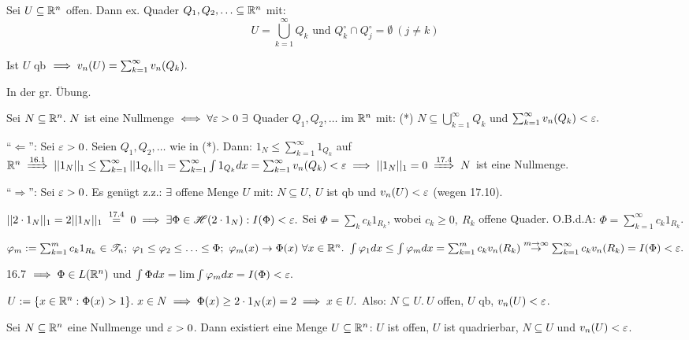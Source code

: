 \documentclass[a4paper,twoside,DIV15,BCOR12mm]{scrbook}
\begin{document}
\begin{satz}
Sei $U\subseteq\mathbb{R}^n$ offen. Dann ex. Quader $Q_1,Q_2,\ldots \subseteq\mathbb{R}^n$ mit: $$U=\bigcup_{k=1}^\infty Q_k\text{ und }Q_k^\circ\cap Q_j^\circ = \emptyset\ (j\ne k)$$

Ist $U$ qb $\implies v_n(U)=\sum_{k=1}^\infty v_n(Q_k).$
\end{satz}

\begin{beweis}
In der gr. Übung.
\end{beweis}

\begin{satz}
Sei $N\subseteq\mathbb{R}^n.\ N$ ist eine Nullmenge $\equizu \forall\ep>0\ \exists$ Quader $Q_1,Q_2,\ldots$ im $\mathbb{R}^n$ mit: (*) $N\subseteq\bigcup_{k=1}^\infty Q_k$ und $\sum_{k=1}^\infty v_n(Q_k)<\varepsilon.$
\end{satz}

\begin{beweis}
"`$\Leftarrow$"': Sei $\varepsilon>0$. Seien $Q_1,Q_2,\ldots$ wie in (*). Dann: $1_N\le\sum_{k=1}^\infty 1_{Q_k}$ auf $\MdR^n \folgtnach{16.1} ||1_N||_1\le\sum_{k=1}^\infty||1_{Q_k}||_1 = \sum_{k=1}^\infty\int1_{Q_k}dx = \sum_{k=1}^\infty v_n(Q_k) < \ep \folgt ||1_N||_1 = 0 \folgtnach{17.4} N$ ist eine Nullmenge.

"`$\Rightarrow$"': Sei $\varepsilon>0$. Es genügt z.z.: $\exists$ offene Menge $U$ mit: $N\subseteq U,\ U$ ist qb und $v_n(U)<\varepsilon$ (wegen 17.10).

$||2\cdot1_N||_1 = 2||1_N||_1 \gleichnach{17.4}0 \folgt \exists \Phi\in\H(2\cdot1_N):I(\Phi)<\ep.$ Sei $\Phi=\sum_kc_k1_{R_k}$, wobei $c_k\ge0,\ R_k$ offene Quader. O.B.d.A: $\Phi=\sum_{k=1}^\infty c_k1_{R_k}$.

$\varphi_m:=\sum_{k=1}^mc_k1_{R_k}\in\T_n;\ \varphi_1\le\varphi_2\le\ldots\le\Phi;\ \varphi_m(x)\to\Phi(x)\ \forall x\in\MdR^n.\ \int\varphi_1dx\le\int\varphi_mdx = \sum_{k=1}^mc_kv_n(R_k) \overset{m\to\infty}{\to} \sum_{k=1}^\infty c_kv_n(R_k) = I(\Phi) < \ep.$

16.7 $\implies\Phi\in L(\mathbb{R}^n)$ und $\int\Phi dx = \lim\int\varphi_m dx = I(\Phi) < \varepsilon.$

$U:=\{x\in\mathbb{R}^n:\Phi(x)>1\}.\ x\in N \implies \Phi(x) \ge 2\cdot1_N(x) = 2\implies x\in U.$ Also: $N\subseteq U.\ U$ offen, $U$ qb, $v_n(U)<\varepsilon$.
\end{beweis}

\begin{folgerung}
Sei $N\subseteq\mathbb{R}^n$ eine Nullmenge und $\varepsilon>0$. Dann existiert eine Menge $U\subseteq\mathbb{R}^n$: $U$ ist offen, $U$ ist quadrierbar, $N\subseteq U$ und $v_n(U)<\varepsilon$.
\end{folgerung}
\end{document}

